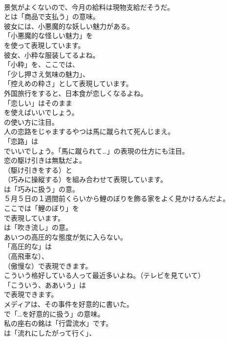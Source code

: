 \documentclass[8pt]{extreport}
\begin{document}
\begin{CJK}{UTF8}{min}
\\	景気がよくないので、今月の給料は現物支給だそうだ。 
\\	とは「商品で支払う」の意味。	
\\	彼女には、小悪魔的な妖しい魅力がある。 
\\	「小悪魔的な怪しい魅力」を
\\	を使って表現しています。	
\\	彼女、小粋な服装してるよね。 
\\	「小粋」を、ここでは、
\\	「少し押さえ気味の魅力」、
\\	「控えめの粋さ」として表現しています。	
\\	外国旅行をすると、日本食が恋しくなるよね。 
\\	「恋しい」はそのまま
\\	を使えばいいでしょう。
\\	の使い方に注目。	
\\	人の恋路をじゃまするやつは馬に蹴られて死んじまえ。 
\\	「恋路」は 
\\	でいいでしょう。「馬に蹴られて…」の表現の仕方にも注目。	
\\	恋の駆け引きは無駄だよ。 
\\	（駆け引きをする）と 
\\	（巧みに操縦する）を組み合わせて表現しています。
\\	は「巧みに扱う」の意。	
\\	５月５日の１週間前くらいから鯉のぼりを飾る家をよく見かけるんだよ。 
\\	ここでは「鯉のぼり」を 
\\	で表現しています。
\\	は「吹き流し」の意。	
\\	あいつの高圧的な態度が気に入らない。 
\\	「高圧的な」は
\\	（高飛車な）、
\\	（傲慢な）で表現できます。	
\\	こういう格好している人って最近多いよね。（テレビを見ていて） 
\\	「こういう、ああいう」は
\\	で表現できます。	
\\	メディアは、その事件を好意的に書いた。 
\\	で「…を好意的に扱う」の意味。	
\\	私の座右の銘は「行雲流水」です。 
\\	は「流れにしたがって行く」、

\end{CJK}
\end{document}
